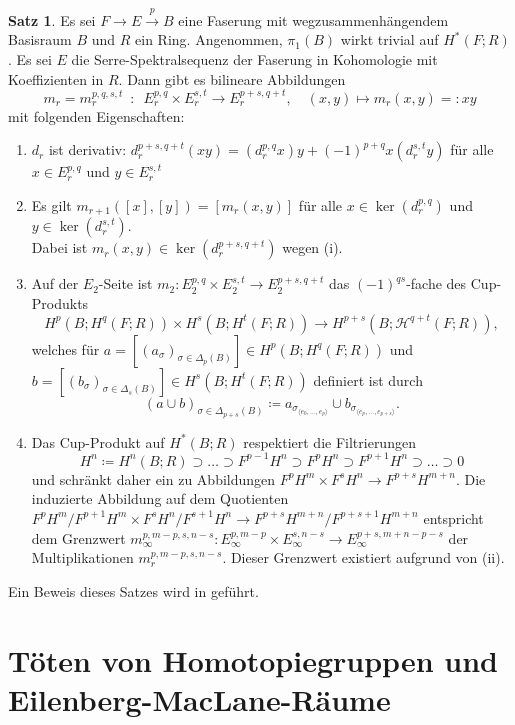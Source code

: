 \documentclass[11pt, a4paper, german]{article}
\theoremstyle{definition}
\newtheorem{satz}[lem]{Satz}
\theoremstyle{remark}
\newcommand{\angles}[1]{{\langle #1 \rangle}}
\newcommand{\LH}{\mathcal{H}} %
\begin{document}
\begin{satz}
  Es sei $F \to E \xrightarrow{p} B$ eine Faserung mit wegzusammenhängendem Basisraum $B$ und $R$ ein Ring.
  Angenommen, $\pi_1(B)$ wirkt trivial auf $H^*(F; R)$.
  Es sei $E$ die Serre-Spektralsequenz der Faserung in Kohomologie mit Koeffizienten in $R$.
  Dann gibt es bilineare Abbildungen
  \[
    m_r = m_r^{p,q,s,t} \enspace:\enspace E^{p,q}_r \times E^{s,t}_r \to E^{p+s,q+t}_r, \quad
    (x, y) \mapsto m_r(x, y) =: xy
  \]
  mit folgenden Eigenschaften:
  \begin{enumerate}[label=(\roman*)]
    \item $d_r$ ist derivativ: $d_r^{p+s,q+t}(xy) = (d_r^{p,q} x) y + (-1)^{p+q} x (d_r^{s,t} y)$ für alle $x \in E^{p,q}_r$ und $y \in E^{s,t}_r$
    \item Es gilt $m_{r+1}([x], [y]) = [m_r(x, y)]$ für alle $x \in \ker(d_r^{p,q})$ und $y \in \ker(d_r^{s,t})$. \\
    Dabei ist $m_r(x, y) \in \ker(d_r^{p+s,q+t})$ wegen (i).
    \item Auf der $E_2$-Seite ist $m_2 : E_2^{p,q} \!\times\! E_2^{s,t} \!\to\! E_2^{p+s,q+t}$ das $(-1)^{qs}$-fache des Cup-Produkts
    \[
      H^p(B; H^q(F; R)) \times H^s(B; H^t(F; R)) \to H^{p+s}(B; \LH^{q+t}(F; R)),
    \]
    welches für $a = [(a_\sigma)_{\sigma \in \Delta_p(B)}] \in H^p(B; H^q(F; R))$ und $b = [(b_\sigma)_{\sigma \in \Delta_s(B)}] \in H^s(B; H^t(F; R))$ definiert ist durch
    \[
      (a \cup b)_{\sigma \in \Delta_{p+s}(B)} \coloneqq
      a_{\sigma_{\angles{e_0, \ldots, e_p}}} \cup b_{\sigma_{\angles{e_p, \ldots, e_{p+s}}}}.
    \]
    \item Das Cup-Produkt auf $H^*(B; R)$ respektiert die Filtrierungen
    \[ H^n \coloneqq H^n(B; R) \supset \ldots \supset F^{p-1} H^n \supset F^p H^n \supset F^{p+1} H^n \supset \ldots \supset 0 \]
    und schränkt daher ein zu Abbildungen $F^p H^m \times F^s H^n \to F^{p+s} H^{m+n}$.
    Die induzierte Abbildung auf dem Quotienten $F^p H^m/F^{p+1} H^m \times F^s H^n/F^{s+1} H^n \to F^{p+s} H^{m+n} / F^{p+s+1} H^{m+n}$ entspricht dem Grenzwert $m_\infty^{p,m-p,s,n-s} : E_\infty^{p,m-p} \times E_\infty^{s,n-s} \to E_\infty^{p+s,m+n-p-s}$ der Multiplikationen $m_r^{p,m-p,s,n-s}$.
    Dieser Grenzwert existiert aufgrund von (ii).
  \end{enumerate}
\end{satz}

Ein Beweis dieses Satzes wird in \cite[Abschnitt 5.3]{mccleary:ss} geführt.

\section{Töten von Homotopiegruppen und Eilenberg-MacLane-Räume}
\end{document}
